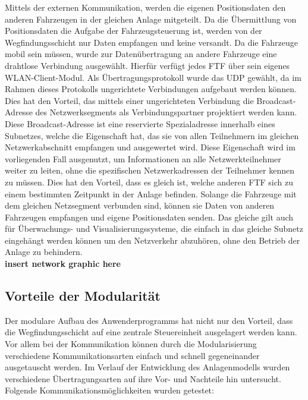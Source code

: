 		Mittels der externen Kommunikation, werden die eigenen Positionsdaten den anderen Fahrzeugen in der gleichen Anlage mitgeteilt. Da die Übermittlung von Positionsdaten die Aufgabe der Fahrzeugsteuerung ist, werden von der Wegfindungsschicht nur Daten empfangen und keine versandt. Da die Fahrzeuge mobil sein müssen, wurde zur Datenübertragung an andere Fahrzeuge eine drahtlose Verbindung ausgewählt. Hierfür verfügt jedes \ac{FTF} über sein eigenes \acs{WLAN}-Client-Modul. Als Übertragungsprotokoll wurde das \ac{UDP} gewählt, da im Rahmen dieses Protokolls ungerichtete Verbindungen aufgebaut werden können. Dies hat den Vorteil, das mittels einer ungerichteten Verbindung die Broadcast-Adresse des Netzwerksegments als Verbindungspartner projektiert werden kann.
		\\
		Diese Broadcast-Adresse ist eine reservierte Spezialadresse innerhalb eines Subnetzes, welche die Eigenschaft hat, das sie von allen Teilnehmern im gleichen Netzwerkabschnitt empfangen und ausgewertet wird. Diese Eigenschaft wird im vorliegenden Fall ausgenutzt, um Informationen an alle Netzwerkteilnehmer weiter zu leiten, ohne die spezifischen Netzwerkadressen der Teilnehmer kennen zu müssen. Dies hat den Vorteil, dass es gleich ist, welche anderen \ac{FTF} sich zu einem bestimmten Zeitpunkt in der Anlage befinden. Solange die Fahrzeuge mit dem gleichen Netzsegment verbunden sind, können sie Daten von anderen Fahrzeugen empfangen und eigene Positionsdaten senden. Das gleiche gilt auch für Überwachungs- und Visualisierungssysteme, die einfach in das gleiche Subnetz eingehängt werden können um den Netzverkehr abzuhören, ohne den Betrieb der Anlage zu behindern.
		\\
		\textbf{insert network graphic here}
		
	\subsection{Vorteile der Modularität}
		
		Der modulare Aufbau des Anwenderprogramms hat nicht nur den Vorteil, dass die Wegfindungsschicht auf eine zentrale Steuereinheit ausgelagert werden kann. Vor allem bei der Kommunikation können durch die Modularisierung verschiedene Kommunikationsarten einfach und schnell gegeneinander ausgetauscht werden. Im Verlauf der Entwicklung des Anlagenmodells wurden verschiedene Übertragungsarten auf ihre Vor- und Nachteile hin untersucht.
		Folgende Kommunikationsmöglichkeiten wurden getestet:
		
